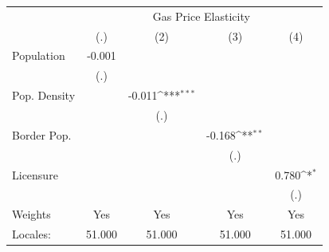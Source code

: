 {
\def\sym#1{\ifmmode^{#1}\else\(^{#1}\)\fi}
\begin{tabular}{l*{4}{c}}
\hline\hline
            &\multicolumn{4}{c}{Gas Price Elasticity}                                               \\
            &\multicolumn{1}{c}{(.)}         &\multicolumn{1}{c}{(2)}         &\multicolumn{1}{c}{(3)}         &\multicolumn{1}{c}{(4)}         \\
\hline
Population  &      -0.001         &                     &                     &                     \\
            &     (.)         &                     &                     &                     \\
[1em]
Pop. Density&                     &      -0.011\sym{***}&                     &                     \\
            &                     &     (.)         &                     &                     \\
[1em]
Border Pop. &                     &                     &      -0.168\sym{**} &                     \\
            &                     &                     &     (.)         &                     \\
[1em]
Licensure   &                     &                     &                     &       0.780\sym{*}  \\
            &                     &                     &                     &     (.)         \\
\hline
Weights     &         Yes         &         Yes         &         Yes         &         Yes         \\
Locales:    &      51.000         &      51.000         &      51.000         &      51.000         \\
\hline\hline
\end{tabular}
}
